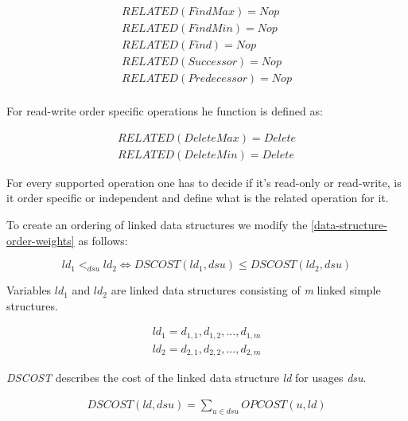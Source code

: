 \documentclass[a4paper,11pt]{article}
\begin{document}
			\begin{eqnarray}
                \mathit{RELATED}(FindMax) = Nop\\
                \mathit{RELATED}(FindMin) = Nop\\
                \mathit{RELATED}(Find) = Nop\\
                \mathit{RELATED}(Successor) = Nop\\
                \mathit{RELATED}(Predecessor) = Nop\\
            \end{eqnarray}

			For read-write order specific operations he function is defined as:

			\begin{eqnarray}
                \mathit{RELATED}(DeleteMax) = Delete\\
                \mathit{RELATED}(DeleteMin) = Delete
            \end{eqnarray}

            For every supported operation one has to decide if it's read-only or read-write, is it order specific or independent and define what is the related operation for it.

            To create an ordering of linked data structures we modify the \autoref{data-structure-order-weights} as follows:

            \begin{equation} \label{data-structure-order-different-types}
                ld_1 <_{dsu} ld_2 \Leftrightarrow \mathit{DSCOST}(ld_1, dsu) \leq \mathit{DSCOST}(ld_2, dsu) 
            \end{equation}

            Variables $ld_1$ and $ld_2$ are linked data structures consisting of \emph{m} linked simple structures.

            \begin{eqnarray}
            	ld_1 = d_{1,1}, d_{1,2}, ..., d_{1,m}\\            
            	ld_2 = d_{2,1}, d_{2,2}, ..., d_{2,m}
            \end{eqnarray}

            \emph{DSCOST} describes the cost of the linked data structure \emph{ld} for usages \emph{dsu}.

            \begin{eqnarray}
                \mathit{DSCOST}(ld,dsu) = \sum_{u \in dsu} \mathit{OPCOST}(u, ld)
            \end{eqnarray}
\end{document}
